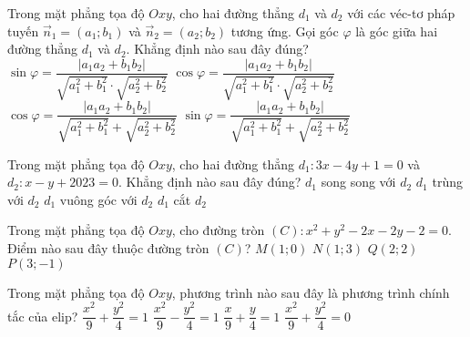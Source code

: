 \begin{ex}%
	Trong mặt phẳng tọa độ $Oxy$, cho hai đường thẳng $d_1$ và $d_2$ với các véc-tơ pháp tuyến $\overrightarrow{n}_1=(a_1;b_1)$ và $\overrightarrow{n}_2=(a_2;b_2)$ tương ứng. Gọi góc $\varphi$ là góc giữa hai đường thẳng $d_1$ và $d_2$. Khẳng định nào sau đây đúng?
	\choice
	{$\sin\varphi=\dfrac{|a_1a_2+b_1b_2|}{\sqrt{a^2_1+b^2_1}\cdot\sqrt{a_2^2+b_2^2}}$}
	{\True $\cos\varphi=\dfrac{|a_1a_2+b_1b_2|}{\sqrt{a^2_1+b^2_1}\cdot\sqrt{a_2^2+b_2^2}}$}
	{$\cos\varphi=\dfrac{|a_1a_2+b_1b_2|}{\sqrt{a^2_1+b^2_1}+\sqrt{a_2^2+b_2^2}}$}
	{$\sin\varphi=\dfrac{|a_1a_2+b_1b_2|}{\sqrt{a^2_1+b^2_1}+\sqrt{a_2^2+b_2^2}}$}
\end{ex}
\begin{ex}%
	Trong mặt phẳng tọa độ $Oxy$, cho hai đường thẳng $d_1\colon 3x-4y+1=0$ và $d_2\colon x-y+2023=0$. Khẳng định nào sau đây đúng?
	\choice
	{$d_1$ song song với $d_2$}
	{$d_1$ trùng với $d_2$}
	{$d_1$ vuông góc với $d_2$}
	{\True $d_1$ cắt $d_2$}
\end{ex}
\begin{ex}%
	Trong mặt phẳng tọa độ $Oxy$, cho đường tròn $(C)\colon x^2+y^2-2x-2y-2=0$. Điểm nào sau đây thuộc đường tròn $(C)$?
	\choice
	{$M(1;0)$}
	{\True $N(1;3)$}
	{$Q(2;2)$}
	{$P(3;-1)$}
\end{ex}
\begin{ex}%
	Trong mặt phẳng tọa độ $Oxy$, phương trình nào sau đây là phương trình chính tắc của elip?
	\choice
	{\True $\dfrac{x^2}{9}+\dfrac{y^2}{4}=1$}
	{$\dfrac{x^2}{9}-\dfrac{y^2}{4}=1$}
	{$\dfrac{x}{9}+\dfrac{y}{4}=1$}
	{$\dfrac{x^2}{9}+\dfrac{y^2}{4}=0$}
\end{ex}
